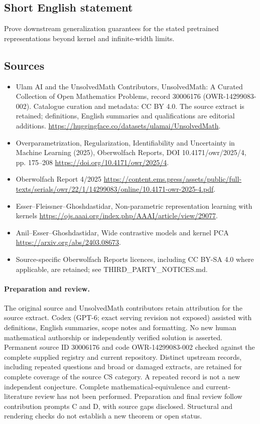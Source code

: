 \documentclass[11pt]{article}
\begin{document}
\subsection{Short English statement}
Prove downstream generalization guarantees for the stated pretrained representations beyond kernel and infinite-width limits.
\subsection{Sources}
\begin{itemize}
\item[\hypertarget{source:30006176:1}{S1}] Ulam AI and the UnsolvedMath Contributors, UnsolvedMath: A Curated Collection of Open Mathematics Problems, record 30006176 (OWR-14299083-002). Catalogue curation and metadata: CC BY 4.0. The source extract is retained; definitions, English summaries and qualifications are editorial additions.
\url{https://huggingface.co/datasets/ulamai/UnsolvedMath}.
\item[\hypertarget{source:30006176:2}{S2}] Overparametrization, Regularization, Identifiability and Uncertainty in Machine Learning (2025), Oberwolfach Reports, DOI 10.4171/owr/2025/4, pp. 175--208
\url{https://doi.org/10.4171/owr/2025/4}.
\item[\hypertarget{source:30006176:3}{S3}] Oberwolfach Report 4/2025
\url{https://content.ems.press/assets/public/full-texts/serials/owr/22/1/14299083/online/10.4171-owr-2025-4.pdf}.
\item[\hypertarget{source:30006176:4}{S4}] Esser--Fleissner--Ghoshdastidar, Non-parametric representation learning with kernels
\url{https://ojs.aaai.org/index.php/AAAI/article/view/29077}.
\item[\hypertarget{source:30006176:5}{S5}] Anil--Esser--Ghoshdastidar, Wide contrastive models and kernel PCA
\url{https://arxiv.org/abs/2403.08673}.
\item Source-specific Oberwolfach Reports licences, including CC BY-SA 4.0 where applicable, are retained; see THIRD\_PARTY\_NOTICES.md.
\end{itemize}
\paragraph{Preparation and review.}
The original source and UnsolvedMath contributors retain attribution for the source extract. Codex (GPT-6; exact serving revision not exposed) assisted with definitions, English summaries, scope notes and formatting. No new human mathematical authorship or independently verified solution is asserted. Permanent source ID 30006176 and code OWR-14299083-002 checked against the complete supplied registry and current repository. Distinct upstream records, including repeated questions and broad or damaged extracts, are retained for complete coverage of the source CS category. A repeated record is not a new independent conjecture. Complete mathematical-equivalence and current-literature review has not been performed. Preparation and final review follow contribution prompts C and D, with source gaps disclosed. Structural and rendering checks do not establish a new theorem or open status.
\label{end:30006176}
\end{document}
